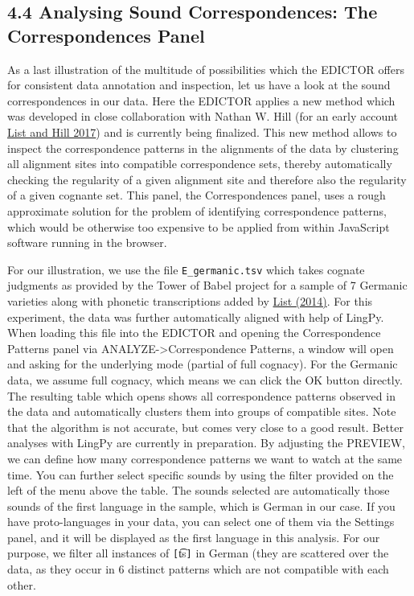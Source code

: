\documentclass[a4paper,svgnames]{scrartcl}
\begin{document}
\subsection*{4.4 Analysing Sound Correspondences: The Correspondences
Panel}\label{analysing-sound-correspondences-the-correspondences-panel}

As a last illustration of the multitude of possibilities which the
EDICTOR offers for consistent data annotation and inspection, let us
have a look at the sound correspondences in our data. Here the EDICTOR
applies a new method which was developed in close collaboration with
Nathan W. Hill (for an early account
\href{http://bibliography.lingpy.org?key=List2017TALKk}{List and Hill
2017}) and is currently being finalized. This new method allows to
inspect the correspondence patterns in the alignments of the data by
clustering all alignment sites into compatible correspondence sets,
thereby automatically checking the regularity of a given alignment site
and therefore also the regularity of a given cognante set. This panel,
the Correspondences panel, uses a rough approximate solution for the
problem of identifying correspondence patterns, which would be otherwise
too expensive to be applied from within JavaScript software running in
the browser.

For our illustration, we use the file \texttt{E\_germanic.tsv} which
takes cognate judgments as provided by the Tower of Babel project for a
sample of 7 Germanic varieties along with phonetic transcriptions added
by \href{http://bibliography.lingpy.org?key=List2014d}{List (2014)}. For
this experiment, the data was further automatically aligned with help of
LingPy. When loading this file into the EDICTOR and opening the
Correspondence Patterns panel via ANALYZE-\textgreater{}Correspondence
Patterns, a window will open and asking for the underlying mode (partial
of full cognacy). For the Germanic data, we assume full cognacy, which
means we can click the OK button directly. The resulting table which
opens shows all correspondence patterns observed in the data and
automatically clusters them into groups of compatible sites. Note that
the algorithm is not accurate, but comes very close to a good result.
Better analyses with LingPy are currently in preparation. By adjusting
the PREVIEW, we can define how many correspondence patterns we want to
watch at the same time. You can further select specific sounds by using
the filter provided on the left of the menu above the table. The sounds
selected are automatically those sounds of the first language in the
sample, which is German in our case. If you have proto-languages in your
data, you can select one of them via the Settings panel, and it will be
displayed as the first language in this analysis. For our purpose, we
filter all instances of \texttt{{[}}t͡s\texttt{{]}} in German (they are
scattered over the data, as they occur in 6 distinct patterns which are
not compatible with each other.
\end{document}
